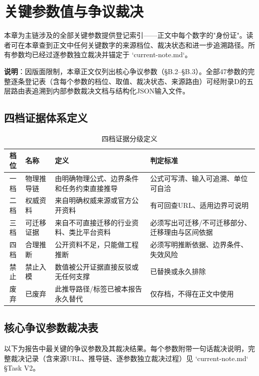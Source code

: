 
\section{关键参数值与争议裁决}

本章为主链涉及的全部关键参数提供登记索引——正文中每个数字的"身份证"。读者可在本章查到正文中任何关键数字的来源档位、裁决状态和进一步追溯路径。所有参数均已经过逐参数独立裁决并锚定于 `current-note.md`。

\textbf{说明}：因版面限制，本章正文仅列出核心争议参数（§B.2–§B.3）。全部47参数的完整逐条登记表（含每个参数的档位、取值、裁决状态、来源路由）可经附录D的五层路由表追溯到内部参数裁决文档与结构化JSON输入文件。

\subsection{四档证据体系定义}

\begin{table}[H]
  \centering
  \caption{四档证据分级定义}
  \label{tab:evidence-tiers}
  \begin{tabular}{cp{1.8cm}p{4.5cm}p{5.5cm}}
  \toprule
  \textbf{档位} & \textbf{名称} & \textbf{定义} & \textbf{判定标准} \\
  \midrule
  一档 & 物理推导链 & 由明确物理公式、边界条件和任务约束直接推导 & 公式可写清、输入可追溯、单位可自洽 \\
  二档 & 权威资料 & 来自明确权威来源或官方公开资料 & 有可回查URL、适用边界可说明 \\
  三档 & 可迁移证据 & 来自不可直接迁移的行业资料、类比平台资料 & 必须写出可迁移/不可迁移部分、迁移理由与区间依据 \\
  四档 & 合理推断 & 公开资料不足，只能做工程推断 & 必须写明推断依据、边界条件、失效风险 \\
  禁止 & 禁止入模 & 数值被公开证据直接反驳或无任何支撑 & 已替换或永久排除 \\
  废弃 & 已废弃 & 此推导路径/标签已被本报告永久替代 & 仅存档，不得在正文中使用 \\
  \bottomrule
  \end{tabular}
\end{table}

\subsection{核心争议参数裁决表}

以下为报告中最关键的争议参数及其裁决结果。每个参数附带一句话裁决说明，完整裁决记录（含来源URL、推导链、逐参数独立裁决过程）见 `current-note.md` §Task V2。

